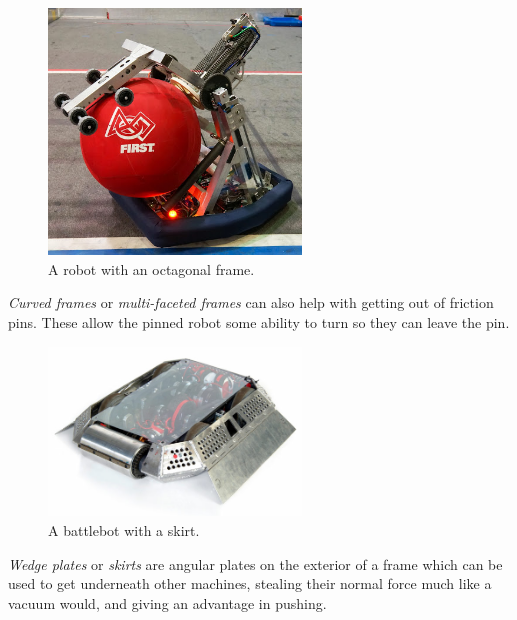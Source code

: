 \begin{figure}[H]
	\includegraphics[width=0.6\textwidth]{imgs/drivetrain_octagon.png}
	\caption{A robot with an octagonal frame.}
\end{figure}

\textit{Curved frames} or \textit{multi-faceted frames} can also help with getting out of friction pins. These allow the pinned robot some ability to turn so they can leave the pin.

\begin{figure}[H]
	\includegraphics[width=0.6\textwidth]{imgs/drivetrain_skirt.jpeg}
	\caption{A battlebot with a skirt.}
\end{figure}

\textit{Wedge plates} or \textit{skirts} are angular plates on the exterior of a frame which can be used to get underneath other machines, stealing their normal force much like a vacuum would, and giving an advantage in pushing.